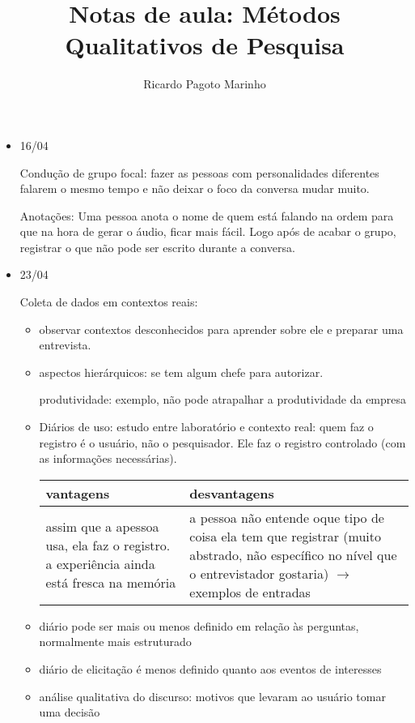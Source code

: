 \documentclass[11pt,a4paper]{book}
\title{Notas de aula: Métodos Qualitativos de Pesquisa}
\author{Ricardo Pagoto Marinho}
\begin{document}
\maketitle
	\begin{itemize}
		\item 16/04
		
		Condução de grupo focal: fazer as pessoas com personalidades diferentes falarem o mesmo tempo e não deixar o foco da conversa mudar muito.
		
		Anotações: Uma pessoa anota o nome de quem está falando na ordem para que na hora de gerar o áudio, ficar mais fácil.
		Logo após de acabar o grupo, registrar o que não pode ser escrito durante a conversa.
		
		\item 23/04
		
		Coleta de dados em contextos reais:
		
		\begin{itemize}
			\item observar contextos desconhecidos para aprender sobre ele e preparar uma entrevista.
			
			\item aspectos hierárquicos: se tem algum chefe para autorizar.
			
			produtividade: exemplo, não pode atrapalhar a produtividade da empresa
			
			\item Diários de uso: estudo entre laboratório e contexto real: quem faz o registro é o usuário, não o pesquisador.
			Ele faz o registro controlado (com as informações necessárias).
			
			
			\begin{tabular}{|p{4cm}|p{4cm}|}
			\hline
			vantagens & desvantagens\\
			\hline
			assim que a apessoa usa, ela faz o registro. a experiência ainda está fresca na memória & a pessoa não entende oque tipo de coisa ela tem que registrar (muito abstrado, não específico no nível que o entrevistador gostaria) $\rightarrow$ exemplos de entradas\\
			\hline
			\end{tabular}
			
			\item diário pode ser mais ou menos definido em relação às perguntas, normalmente mais estruturado
			
			\item diário de elicitação é menos definido quanto aos eventos de interesses
			
			\item análise qualitativa do discurso: motivos que levaram ao usuário tomar uma decisão
			
		\end{itemize}
		
	\end{itemize}
\end{document}
